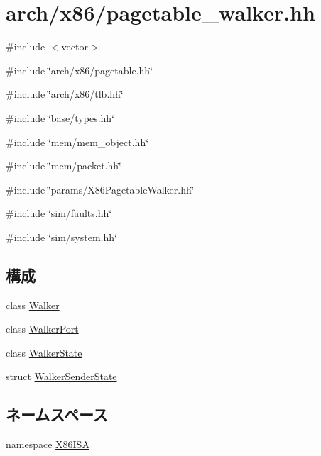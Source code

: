\hypertarget{pagetable__walker_8hh}{
\section{arch/x86/pagetable\_\-walker.hh}
\label{pagetable__walker_8hh}
}
{\ttfamily \#include $<$vector$>$}\par
{\ttfamily \#include \char`\"{}arch/x86/pagetable.hh\char`\"{}}\par
{\ttfamily \#include \char`\"{}arch/x86/tlb.hh\char`\"{}}\par
{\ttfamily \#include \char`\"{}base/types.hh\char`\"{}}\par
{\ttfamily \#include \char`\"{}mem/mem\_\-object.hh\char`\"{}}\par
{\ttfamily \#include \char`\"{}mem/packet.hh\char`\"{}}\par
{\ttfamily \#include \char`\"{}params/X86PagetableWalker.hh\char`\"{}}\par
{\ttfamily \#include \char`\"{}sim/faults.hh\char`\"{}}\par
{\ttfamily \#include \char`\"{}sim/system.hh\char`\"{}}\par
\subsection*{構成}
\begin{DoxyCompactItemize}
\item 
class \hyperlink{classX86ISA_1_1Walker}{Walker}
\item 
class \hyperlink{classX86ISA_1_1Walker_1_1WalkerPort}{WalkerPort}
\item 
class \hyperlink{classX86ISA_1_1Walker_1_1WalkerState}{WalkerState}
\item 
struct \hyperlink{structX86ISA_1_1Walker_1_1WalkerSenderState}{WalkerSenderState}
\end{DoxyCompactItemize}
\subsection*{ネームスペース}
\begin{DoxyCompactItemize}
\item 
namespace \hyperlink{namespaceX86ISA}{X86ISA}
\end{DoxyCompactItemize}
